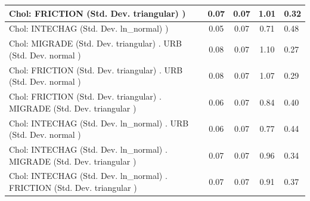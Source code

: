 \begin{table}
\begin{center}
\begin{tabular}{|l|l|c|c|c|l|}
			\hline
			 Chol: FRICTION (Std. Dev. triangular) ) &  & 0.07 & 0.07 & 1.01 & 0.32 \\
			\hline
			 Chol: INTECHAG (Std. Dev. ln_normal) ) &  & 0.05 & 0.07 & 0.71 & 0.48 \\
			\hline
			 Chol: MIGRADE (Std. Dev. triangular) . URB (Std. Dev.   normal ) &  & 0.08 & 0.07 & 1.10 & 0.27 \\
			\hline
			 Chol: FRICTION (Std. Dev. triangular) . URB (Std. Dev.   normal ) &  & 0.08 & 0.07 & 1.07 & 0.29 \\
			\hline
			 Chol: FRICTION (Std. Dev. triangular) . MIGRADE (Std. Dev.   triangular ) &  & 0.06 & 0.07 & 0.84 & 0.40 \\
			\hline
			 Chol: INTECHAG (Std. Dev. ln_normal) . URB (Std. Dev.   normal ) &  & 0.06 & 0.07 & 0.77 & 0.44 \\
			\hline
			 Chol: INTECHAG (Std. Dev. ln_normal) . MIGRADE (Std. Dev.   triangular ) &  & 0.07 & 0.07 & 0.96 & 0.34 \\
			\hline
			 Chol: INTECHAG (Std. Dev. ln_normal) . FRICTION (Std. Dev.   triangular ) &  & 0.07 & 0.07 & 0.91 & 0.37 \\
			\hline
		\end{tabular}
	\end{center}
\end{table}